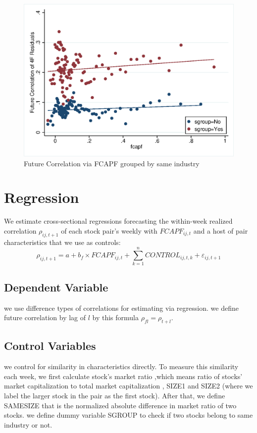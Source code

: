 \documentclass[12pt]{article}
\begin{document}
\begin{figure}[htbp]
\centering
\includegraphics[width = 0.7\columnwidth ]{mygraph.eps}
\caption{Future Correlation via FCAPF grouped by same industry}
\label{f2}
\end{figure}


\FloatBarrier
\section{Regression}

We estimate cross-sectional regressions forecasting the within-week realized
correlation $ \rho_{ij,t+1} $ of each stock pair’s weekly with $ FCAPF_{ij,t} $ and a host of pair characteristics that we use as controls:
\begin{equation}
\rho_{ij,t+1} = a + b_f \times FCAPF_{ij,t} + \sum_{k = 1}^{n } CONTROL_{ij,t,k} + \varepsilon_{ij,t+1}
\label{e1}
\end{equation}

\subsection{Dependent Variable}
we use difference types of correlations for estimating via regression. we define future correlation by lag of $ l $ by this formula $ \rho_{fl} =  \rho_{t+l} $.

\subsection{Control Variables}
we control for similarity in characteristics
directly. To measure this similarity each week, we first calculate stock’s market ratio ,which means ratio of stocks' market capitalization to total market capitalization , SIZE1 and SIZE2 (where we label the
larger stock in the pair as the first stock). After that, we define SAMESIZE that is the normalized absolute difference in market ratio of two stocks.
we define dummy variable SGROUP to check if two stocks belong to same industry or not.
\end{document}
